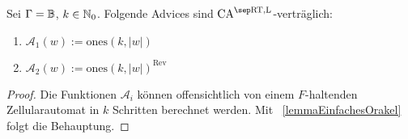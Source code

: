 \begin{corollary}
    Sei $\Gamma = \mathbb{B}$, $k \in \mathbb{N}_0$.
    Folgende Advices sind $\CAM{\CART, \CALeft}$-verträglich:
    \begin{enumerate}
        \item $\mathcal{A}_1(w) := \mathrm{ones}(k, |w|)$ 
        \item $\mathcal{A}_2(w) := \mathrm{ones}(k, |w|)^{\mathrm{Rev}}$
    \end{enumerate}
\end{corollary}
\begin{proof}
    Die Funktionen $\mathcal{A}_i$ können offensichtlich
    von einem $F$-haltenden Zellularautomat in $k$ Schritten berechnet werden.
    Mit ~\cref{lemmaEinfachesOrakel} folgt die Behauptung.
\end{proof}

\begin{comment}
        $Q' := (Q_C \times \finset{ 0, \dots, c })$. Identifiziere $\Sigma' := \Sigma_C$ mit $(\finset{\chr{0}} \times \Sigma_C) \times \finset{0} $. Setze $\#' := (\#_C, 0)$.
        
        $\delta'(\Spvek{\#_C; k_a}, \Spvek{\Spvek{ \gamma_b; c_b}; k_b}, c) := \Spvek{ \Spvek{\chr{1}; c_b}; k_b + 1}$
        
        $\delta'(\Spvek{\Spvek{\gamma_a; c_a}; k_a}, \Spvek{\Spvek{\gamma_b; c_b}; k_b}, c)
            := \Spvek{ \Spvek{ \max \finset{\gamma_a, \gamma_b}; c_b}; k_b + 1}$
        
        $\delta'(a, \Spvek{q_b; k_b}, c) := \Spvek{q_b; k_b + 1}$
\end{comment}



